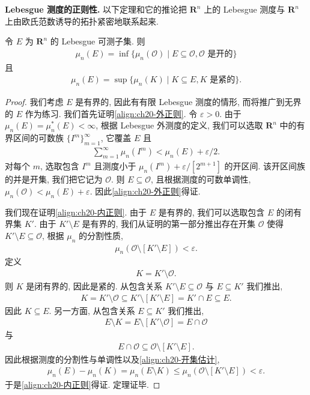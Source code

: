 \documentclass[../../main.tex]{subfiles}
\begin{document}
\textbf{Lebesgue 测度的正则性.} 以下定理和它的推论把 $\mathbf{R}^{n}$ 上的 Lebesgue 测度与 $\mathbf{R}^{n}$ 上由欧氏范数诱导的拓扑紧密地联系起来.

\begin{theorem}\label{theorem:ch20-lebesgue正则}
令 $E$ 为 $\mathbf{R}^{n}$ 的 Lebesgue 可测子集. 则
\begin{align}\label{align:ch20-外正则}
\mu_{n}(E)=\inf\{\mu_{n}(\mathcal{O})\mid E\subseteq\mathcal{O},\mathcal{O}\text{ 是开的}\}
\end{align}
且
\begin{align}\label{align:ch20-内正则}
\mu_{n}(E)=\sup\{\mu_{n}(K)\mid K\subseteq E,K\text{ 是紧的}\}.
\end{align}
\end{theorem}

\begin{proof}
我们考虑 $E$ 是有界的, 因此有有限 Lebesgue 测度的情形, 而将推广到无界的 $E$ 作为练习. 我们首先证明\eqref{align:ch20-外正则}. 令 $\varepsilon>0$. 由于 $\mu_{n}(E)=\mu_{n}^{*}(E)<\infty$, 根据 Lebesgue 外测度的定义, 我们可以选取 $\mathbf{R}^{n}$ 中的有界区间的可数族 $\{I^{m}\}_{m=1}^{\infty}$, 它覆盖 $E$ 且
\begin{align*}
\sum_{m=1}^{\infty}\mu_{n}(I^{m})<\mu_{n}(E)+\varepsilon/2.
\end{align*}
对每个 $m$, 选取包含 $I^{m}$ 且测度小于 $\mu_{n}(I^{m})+\varepsilon/[2^{m+1}]$ 的开区间. 该开区间族的并是开集, 我们把它记为 $\mathcal{O}$. 则 $E\subseteq\mathcal{O}$, 且根据测度的可数单调性, $\mu_{n}(\mathcal{O})<\mu_{n}(E)+\varepsilon$. 因此\eqref{align:ch20-外正则}得证.

我们现在证明\eqref{align:ch20-内正则}. 由于 $E$ 是有界的, 我们可以选取包含 $E$ 的闭有界集 $K'$. 由于 $K'\setminus E$ 是有界的, 我们从证明的第一部分推出存在开集 $\mathcal{O}$ 使得 $K'\setminus E\subseteq\mathcal{O}$, 根据 $\mu_{n}$ 的分割性质,
\begin{align}\label{align:ch20-开集估计}
\mu_{n}(\mathcal{O}\setminus[K'\setminus E])<\varepsilon.
\end{align}
定义
\begin{align*}
K=K'\setminus\mathcal{O}.
\end{align*}
则 $K$ 是闭有界的, 因此是紧的. 从包含关系 $K'\setminus E\subseteq\mathcal{O}$ 与 $E\subseteq K'$ 我们推出,
\begin{align*}
K=K'\setminus\mathcal{O}\subseteq K'\setminus[K'\setminus E]=K'\cap E\subseteq E.
\end{align*}
因此 $K\subseteq E$. 另一方面, 从包含关系 $E\subseteq K'$ 我们推出,
\begin{align*}
E\setminus K=E\setminus[K'\setminus\mathcal{O}]=E\cap\mathcal{O}
\end{align*}
与
\begin{align*}
E\cap\mathcal{O}\subseteq\mathcal{O}\setminus[K'\setminus E].
\end{align*}
因此根据测度的分割性与单调性以及\eqref{align:ch20-开集估计},
\begin{align*}
\mu_{n}(E)-\mu_{n}(K)=\mu_{n}(E\setminus K)\leqslant\mu_{n}(\mathcal{O}\setminus[K'\setminus E])<\varepsilon.
\end{align*}
于是\eqref{align:ch20-内正则}得证. 定理证毕.
\end{proof}
\end{document}
